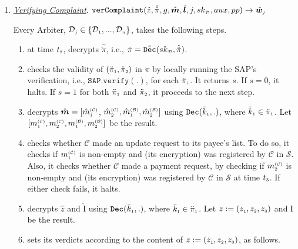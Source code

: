 \begin{enumerate}
\vspace{2mm}
\item\label{VerifyingComplaint}  \underline{\textit{Verifying Complaint}}. $\mathtt{verComplaint}(\hat z, \hat{\ddot{\pi}}, g, \hat {\bm m}, \hat{\bm{l}},  j, {sk}_{\scriptscriptstyle\mathcal {D}}, aux, pp)\rightarrow \hat{\bm w}_{\scriptscriptstyle j}$

Every Arbiter, $\mathcal{D}_{\scriptscriptstyle j}\in\{\mathcal{D}_{\scriptscriptstyle 1}, ..., \mathcal{D}_{\scriptscriptstyle n}\}$, takes the following steps.
\begin{enumerate}

%
\item at time $t_{\scriptscriptstyle 7}$, decrypts $\hat{\ddot{\pi}}$, i.e., ${\ddot{\pi}}=\mathtt{\tilde{Dec}}({sk}_{\scriptscriptstyle\mathcal {D}}, \hat{\ddot \pi})$. 

\item checks the validity  of $(\ddot{\pi}_{\scriptscriptstyle 1}, \ddot{\pi}_{\scriptscriptstyle 2})$ in $\ddot{\pi}$ by locally running  the SAP's verification, i.e., $\mathtt{SAP.verify}(.)$, for each  $\ddot{\pi}_{\scriptscriptstyle i}$. It   returns  $s$. If $s=0$, it halts. If $s=1$ for both $\ddot{\pi}_{\scriptscriptstyle 1}$ and  $\ddot{\pi}_{\scriptscriptstyle 2}$, it proceeds to the next step. 
%
\item decrypts $\hat{\bm m}=[\hat{m}_{\scriptscriptstyle 1}^{\scriptscriptstyle(\mathcal C)}$, $\hat{m}_{\scriptscriptstyle 2}^{\scriptscriptstyle(\mathcal C)}, \hat{m}_{\scriptscriptstyle 1}^{\scriptscriptstyle(\mathcal B)}, \hat{m}_{\scriptscriptstyle 2}^{\scriptscriptstyle(\mathcal B)}]$  using $\mathtt{Dec}(\bar k_{\scriptscriptstyle 1},.)$, where $\bar k_{\scriptscriptstyle 1}\in\ddot \pi_{\scriptscriptstyle 1}$. Let $[{m}_{\scriptscriptstyle 1}^{\scriptscriptstyle(\mathcal C)},  {m}_{\scriptscriptstyle 2}^{\scriptscriptstyle(\mathcal C)},  {m}_{\scriptscriptstyle 1}^{\scriptscriptstyle(\mathcal B)}, {m}_{\scriptscriptstyle 2}^{\scriptscriptstyle(\mathcal B)}]$ be the result. 

\item  checks whether $\mathcal C$ made an update request to its payee's list. To do so, it checks if  $m_{\scriptscriptstyle 1}^{\scriptscriptstyle(\mathcal C)}$  is non-empty and (its encryption) was registered by $\mathcal{C}$ in $\mathcal{S}$. Also, it checks whether $\mathcal C$ made a payment request, by checking if $m_{\scriptscriptstyle 2}^{\scriptscriptstyle(\mathcal C)}$ is non-empty and (its encryption) was registered by $\mathcal{C}$ in $\mathcal{S}$ at time $t_{\scriptscriptstyle 3}$.  If either check fails, it halts. 
\item decrypts $\hat z$ and $\hat{\bm{l}}$ using $\mathtt{Dec}(\bar k_{\scriptscriptstyle 1},.)$, where $\bar k_{\scriptscriptstyle 1}\in\ddot \pi_{\scriptscriptstyle 1}$. Let $ z:=(z_{\scriptscriptstyle 1}, z_{\scriptscriptstyle 2}, z_{\scriptscriptstyle 3})$ and ${\bm{l}}$ be the result. 
%
\item\label{arbiters-verdict} sets its verdicts according to  the content of  $z:=(z_{\scriptscriptstyle 1}, z_{\scriptscriptstyle 2}, z_{\scriptscriptstyle 3})$, as follows.  
%
\begin{itemize}


\end{itemize}
\end{enumerate}
\end{enumerate}
